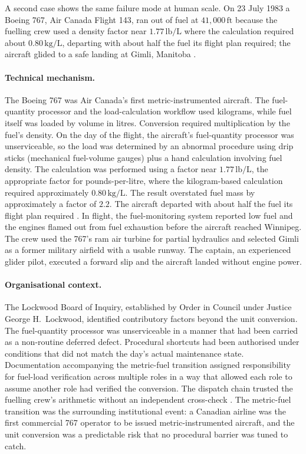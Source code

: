A second case shows the same failure mode at human scale. On 23 July
1983 a Boeing 767, Air Canada Flight 143, ran out of fuel at
$41{,}000\,\text{ft}$ because the fuelling crew used a density
factor near $1.77 \,\text{lb/L}$ where the calculation required
about $0.80 \,\si{\kilogram\per\liter}$, departing with about half
the fuel its flight plan required; the aircraft glided to a safe
landing at Gimli, Manitoba \cite{acc:lockwood-gimli1985}.

\paragraph{Technical mechanism.}
The Boeing 767 was Air Canada's first metric-instrumented aircraft.
The fuel-quantity processor and the load-calculation workflow used
kilograms, while fuel itself was loaded by volume in litres.
Conversion required multiplication by the fuel's density. On the day
of the flight, the aircraft's fuel-quantity processor was
unserviceable, so the load was determined by an abnormal procedure
using drip sticks (mechanical fuel-volume gauges) plus a hand
calculation involving fuel density. The calculation was performed
using a factor near $1.77 \,\text{lb/L}$, the appropriate factor for
pounds-per-litre, where the kilogram-based calculation required
approximately $0.80 \,\si{\kilogram\per\liter}$. The result
overstated fuel mass by approximately a factor of $2.2$. The
aircraft departed with about half the fuel its flight plan required
\cite{acc:lockwood-gimli1985}. In flight, the fuel-monitoring system
reported low fuel and the engines flamed out from fuel exhaustion
before the aircraft reached Winnipeg. The crew used the 767's ram
air turbine for partial hydraulics and selected Gimli as a former
military airfield with a usable runway. The captain, an experienced
glider pilot, executed a forward slip and the aircraft landed
without engine power.

\paragraph{Organisational context.}
The Lockwood Board of Inquiry, established by Order in Council under
Justice George H.\ Lockwood, identified contributory factors beyond
the unit conversion. The fuel-quantity processor was unserviceable
in a manner that had been carried as a non-routine deferred defect.
Procedural shortcuts had been authorised under conditions that did
not match the day's actual maintenance state. Documentation
accompanying the metric-fuel transition assigned responsibility for
fuel-load verification across multiple roles in a way that allowed
each role to assume another role had verified the conversion. The
dispatch chain trusted the fuelling crew's arithmetic without an
independent cross-check \cite{acc:lockwood-gimli1985}. The
metric-fuel transition was the surrounding institutional event: a
Canadian airline was the first commercial 767 operator to be issued
metric-instrumented aircraft, and the unit conversion was a
predictable risk that no procedural barrier was tuned to catch.

